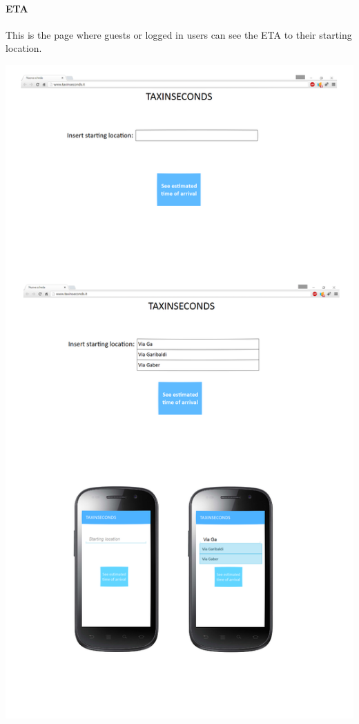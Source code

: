 \documentclass{article}
\begin{document}
\paragraph{ETA}
This is the page where guests or logged in users can see the ETA to their starting location.\\
\begin{center}
	\includegraphics[width=.9\textwidth,height=.9\textheight,keepaspectratio]{ETA-interface}
\end{center}
\clearpage
\end{document}
